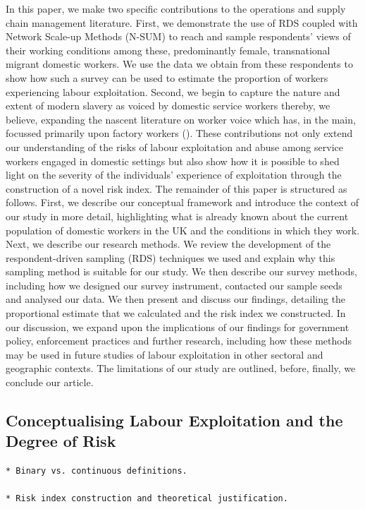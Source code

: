 \documentclass[
  12pt,
  letterpaper,
  DIV=11,
  numbers=noendperiod]{scrartcl}
\theoremstyle{plain}
\theoremstyle{definition}
\begin{document}
In this paper, we make two specific contributions to the operations and
supply chain management literature. First, we demonstrate the use of RDS
coupled with Network Scale-up Methods (N-SUM) to reach and sample
respondents' views of their working conditions among these,
predominantly female, transnational migrant domestic workers. We use the
data we obtain from these respondents to show how such a survey can be
used to estimate the proportion of workers experiencing labour
exploitation. Second, we begin to capture the nature and extent of
modern slavery as voiced by domestic service workers thereby, we
believe, expanding the nascent literature on worker voice which has, in
the main, focussed primarily upon factory workers
(\textcite{stephens_theorising_2024}). These contributions not only
extend our understanding of the risks of labour exploitation and abuse
among service workers engaged in domestic settings but also show how it
is possible to shed light on the severity of the individuals' experience
of exploitation through the construction of a novel risk index. The
remainder of this paper is structured as follows. First, we describe our
conceptual framework and introduce the context of our study in more
detail, highlighting what is already known about the current population
of domestic workers in the UK and the conditions in which they work.
Next, we describe our research methods. We review the development of the
respondent-driven sampling (RDS) techniques we used and explain why this
sampling method is suitable for our study. We then describe our survey
methods, including how we designed our survey instrument, contacted our
sample seeds and analysed our data. We then present and discuss our
findings, detailing the proportional estimate that we calculated and the
risk index we constructed. In our discussion, we expand upon the
implications of our findings for government policy, enforcement
practices and further research, including how these methods may be used
in future studies of labour exploitation in other sectoral and
geographic contexts. The limitations of our study are outlined, before,
finally, we conclude our article.

\subsection{Conceptualising Labour Exploitation and the Degree of
Risk}\label{conceptualising-labour-exploitation-and-the-degree-of-risk}

\begin{verbatim}
* Binary vs. continuous definitions.
    
* Risk index construction and theoretical justification.
    
    
    
\end{verbatim}
\end{document}
